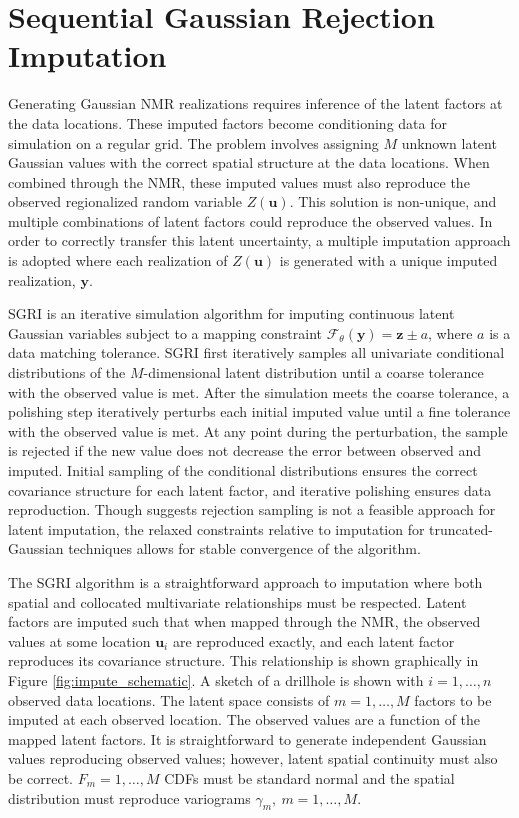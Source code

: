 \FloatBarrier
\section{Sequential Gaussian Rejection Imputation}
\label{sec:sgri}

Generating Gaussian \gls{NMR} realizations requires inference of the latent factors at the data locations. These imputed factors become conditioning data for simulation on a regular grid. The problem involves assigning $M$ unknown latent Gaussian values with the correct spatial structure at the data locations. When combined through the \gls{NMR}, these imputed values must also reproduce the observed regionalized random variable $Z(\mathbf{u})$. This solution is non-unique, and multiple combinations of latent factors could reproduce the observed values. In order to correctly transfer this latent uncertainty, a multiple imputation \citep{barnett2015multivariate} approach is adopted where each realization of $Z(\mathbf{u})$ is generated with a unique imputed realization, $\mathbf{y}$.

\Gls{SGRI} is an iterative simulation algorithm for imputing continuous latent Gaussian variables subject to a mapping constraint $\mathcal{F}_{\theta}\left(\mathbf{y}\right)=\mathbf{z} \pm a$, where $a$ is a data matching tolerance. \Gls{SGRI} first iteratively samples all univariate conditional distributions of the $M$-dimensional latent distribution until a coarse tolerance with the observed value is met. After the simulation meets the coarse tolerance, a polishing step iteratively perturbs each initial imputed value until a fine tolerance with the observed value is met. At any point during the perturbation, the sample is rejected if the new value does not decrease the error between observed and imputed. Initial sampling of the conditional distributions ensures the correct covariance structure for each latent factor, and iterative polishing ensures data reproduction. Though \cite{armstrong2011plurigaussian} suggests rejection sampling is not a feasible approach for latent imputation, the relaxed constraints relative to imputation for truncated-Gaussian techniques allows for stable convergence of the algorithm.

The \gls{SGRI} algorithm is a straightforward approach to imputation where both spatial and collocated multivariate relationships must be respected. Latent factors are imputed such that when mapped through the \gls{NMR}, the observed values at some location $\mathbf{u}_{i}$ are reproduced exactly, and each latent factor reproduces its covariance structure. This relationship is shown graphically in Figure \ref{fig:impute_schematic}. A sketch of a drillhole is shown with $i=1,\dots,n$ observed data locations. The latent space consists of $m=1,\dots,M$ factors to be imputed at each observed location. The observed values are a function of the mapped latent factors. It is straightforward to generate independent Gaussian values reproducing observed values; however, latent spatial continuity must also be correct. $F_{m}=1,\dots,M$ \glspl{CDF} must be standard normal and the spatial distribution must reproduce variograms $\gamma_{m}, \ m=1,\dots,M$.

